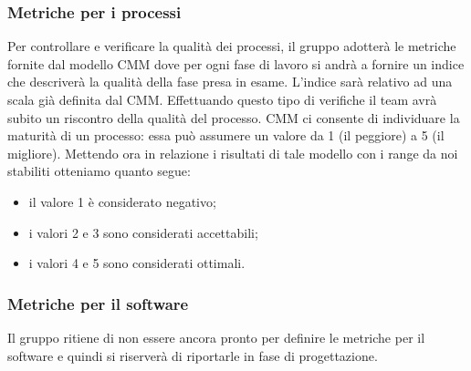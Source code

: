 \documentclass[../PianoDiQualifica.tex]{subfiles}
\begin{document}
			\subsubsection{Metriche per i processi}
			Per controllare e verificare la qualità dei processi, il gruppo adotterà le metriche fornite dal
			modello CMM dove per ogni fase di lavoro si andrà a fornire un indice che descriverà la
			qualità della fase presa in esame. L'indice sarà relativo ad una scala già definita dal CMM.
			Effettuando questo tipo di verifiche il team avrà subito un riscontro della qualità del processo. CMM ci consente di individuare la maturità di un processo: essa può assumere un valore da 1 (il
			peggiore) a 5 (il migliore). Mettendo ora in relazione i risultati di tale modello con i range da noi
			stabiliti otteniamo quanto segue:
			\begin{itemize}
			\item il valore 1 è considerato negativo;
			\item i valori 2 e 3 sono considerati accettabili;
			\item i valori 4 e 5 sono considerati ottimali.
			\end{itemize}
			\subsubsection{Metriche per il software}
			Il gruppo ritiene di non essere ancora pronto per definire le metriche per il software e quindi si riserverà di riportarle in fase di progettazione.
\end{document}
